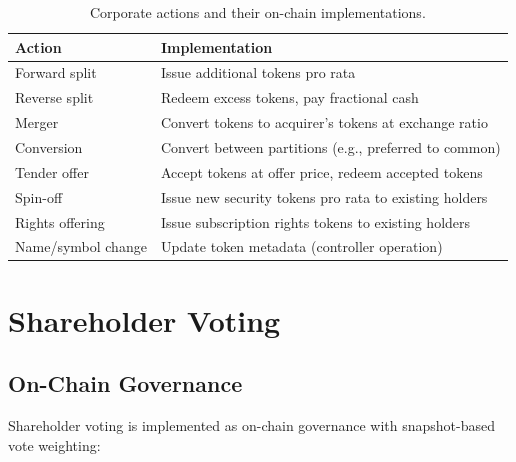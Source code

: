 \documentclass[11pt,a4paper]{article}
\begin{document}
\begin{table}[H]
\centering
\caption{Corporate actions and their on-chain implementations.}
\label{tab:corporate-actions}
\begin{tabular}{lp{7cm}}
\toprule
\textbf{Action} & \textbf{Implementation} \\
\midrule
Forward split & Issue additional tokens pro rata \\
Reverse split & Redeem excess tokens, pay fractional cash \\
Merger & Convert tokens to acquirer's tokens at exchange ratio \\
Conversion & Convert between partitions (e.g., preferred to common) \\
Tender offer & Accept tokens at offer price, redeem accepted tokens \\
Spin-off & Issue new security tokens pro rata to existing holders \\
Rights offering & Issue subscription rights tokens to existing holders \\
Name/symbol change & Update token metadata (controller operation) \\
\bottomrule
\end{tabular}
\end{table}

\section{Shareholder Voting}\label{sec:voting}

\subsection{On-Chain Governance}

Shareholder voting is implemented as on-chain governance with snapshot-based vote weighting:
\end{document}
